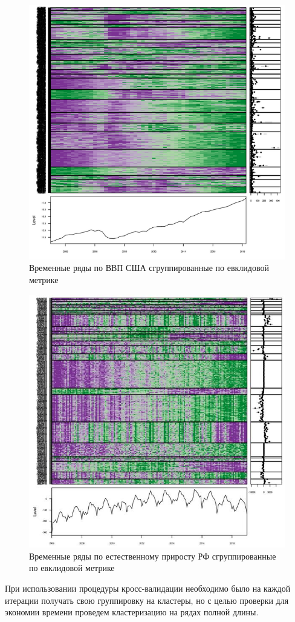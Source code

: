 \documentclass[12pt,a4paper, oneside]{extreport}
\begin{document}
\begin{figure}
	\centering
	\includegraphics[width=0.6\linewidth]{screenshot015}
	\caption{Временные ряды по ВВП США сгруппированные по евклидовой метрике}
	\label{figww}
\end{figure}

\begin{figure}
	\centering
	\includegraphics[width=0.6\linewidth]{screenshot016}
	\caption{Временные ряды по естественному приросту РФ сгруппированные по евклидовой метрике}
	\label{figee}
\end{figure}


При использовании процедуры кросс-валидации необходимо было на каждой итерации получать свою группировку на  кластеры, но с целью проверки для экономии времени проведем кластеризацию на рядах полной длины.




\end{document}

